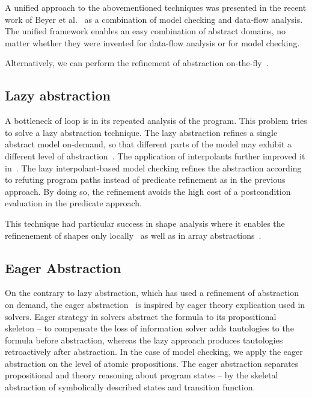 A unified approach to the abovementioned techniques was presented in the recent
work of Beyer et al.~\cite{Beyer2018b} as a combination of model checking and
data-flow analysis. The unified framework enables an easy combination of
abstract domains, no matter whether they were invented for data-flow analysis
or for model checking.

Alternatively, we can perform the refinement of abstraction
on-the-fly~\cite{Beyer2008program}.

\subsection{Lazy abstraction}
\label{sec:lazya}

A bottleneck of \cegar loop is in its repeated analysis of the program. This
problem tries to solve a lazy abstraction technique. The lazy abstraction
refines a single abstract model on-demand, so that different parts of the model
may exhibit a different level of abstraction~\cite{Henzinger2002}. The application of
interpolants further improved it in~\cite{McMillan2006}. The lazy
interpolant-based model checking refines the abstraction according to refuting program paths
instead of predicate refinement as in the previous approach. By doing so,
the refinement avoids the high cost of a postcondition evaluation in the
predicate approach.

This technique had particular success in shape analysis where it enables
the refinenement of shapes only locally~\cite{Henzinger2003,Beyer2006a} as well as in array
abstractions~\cite{Alberti2012, Alberti2012b}.

\subsection{Eager Abstraction}

On the contrary to lazy abstraction, which has used a refinement of abstraction
on demand, the eager abstraction~\cite{McMillan2018} is inspired by eager
theory explication used in \smt solvers. Eager strategy in \smt solvers
abstract the formula to its propositional skeleton -- to compensate the loss of
information \smt solver adds tautologies to the formula before abstraction,
whereas the lazy approach produces tautologies retroactively after abstraction.
In the case of model checking, we apply the eager abstraction on the level of
atomic propositions. The eager abstraction separates propositional and theory
reasoning about program states -- by the skeletal abstraction of symbolically
described states and transition function.

